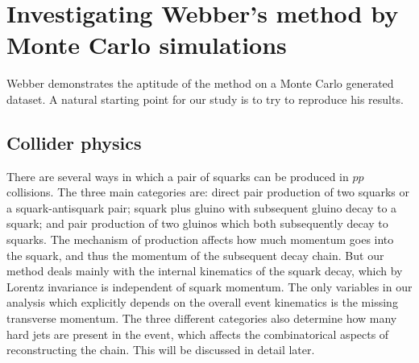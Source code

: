 \documentclass[twoside,english]{uiofysmaster}
\begin{document}
\begin{enumerate}
\end{enumerate}






























\chapter{Investigating Webber's method by Monte Carlo simulations}
\label{ch:MC}
Webber demonstrates the aptitude of the method on a Monte Carlo generated dataset. A natural starting point for our study is to try to reproduce his results. 

\section{Collider physics}
There are several ways in which a pair of squarks can be produced in $pp$ collisions. The three main categories are: direct pair production of two squarks or a squark-antisquark pair; squark plus gluino with subsequent gluino decay to a squark; and pair production of two gluinos which both subsequently decay to squarks. The mechanism of production affects how much momentum goes into the squark, and thus the momentum of the subsequent decay chain. But our method deals mainly with the internal kinematics of the squark decay, which by Lorentz invariance is independent of squark momentum. The only variables in our analysis which explicitly depends on the overall event kinematics is the missing transverse momentum. The three different categories also determine how many hard jets are present in the event, which affects the combinatorical aspects of reconstructing the chain. This will be discussed in detail later.
\end{document}
